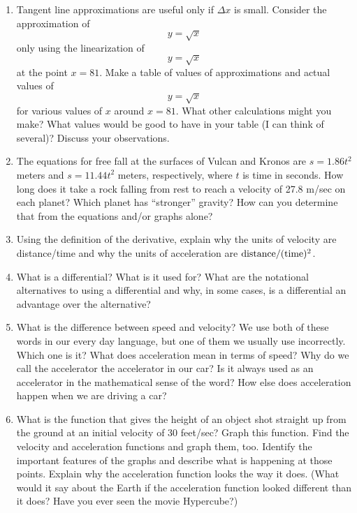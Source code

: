 \begin{enumerate}
\item  Tangent line approximations are useful only if $\Delta x$ is small.  Consider the approximation of $$y = \sqrt x $$ only using the linearization of $$y = \sqrt x $$ at the point $x = 81$.  Make a table of values of approximations and actual values of $$y = \sqrt x $$ for various values of $x$ around $x = 81$.  What other calculations might you make?  What values would be good to have in your table (I can think of several)?  Discuss your observations.

\item  The equations for free fall at the surfaces of Vulcan and Kronos are $s = 1.86t^2$ meters and $s = 11.44t^2$ meters, respectively, where $t$ is time in seconds.  How long does it take a rock falling from rest to reach a velocity of 27.8 m/sec on each planet?  Which planet has ``stronger'' gravity?  How can you determine that from the equations and/or graphs alone?

\item  Using the definition of the derivative, explain why the units of velocity are distance/time and why the units of acceleration are ${\rm{distance}}/({\rm{time}})^2$.

\item  What is a differential?  What is it used for?  What are the notational alternatives to using a differential and why, in some cases, is a differential an advantage over the alternative?

\item  What is the difference between speed and velocity?  We use both of these words in our every day language, but one of them we usually use incorrectly.  Which one is it?  What does acceleration mean in terms of speed?  Why do we call the accelerator the accelerator in our car?  Is it always used as an accelerator in the mathematical sense of the word?  How else does acceleration happen when we are driving a car?

\item  What is the function that gives the height of an object shot straight up from the ground at an initial velocity of 30 feet/sec?  Graph this function.  Find the  velocity and acceleration functions and graph them, too.  Identify the important features of the graphs and describe what is happening at those points.  Explain why the acceleration function looks the way it does.  (What would it say about the Earth if the acceleration function looked different than it does?  Have you ever seen the movie Hypercube?)


\end{enumerate}
